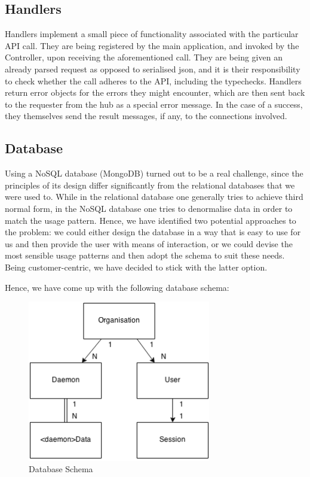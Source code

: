 \documentclass{l3proj}
\begin{document}
\subsection{Handlers}

Handlers implement a small piece of functionality associated with the particular API call. They are being registered by the main application, and invoked by the Controller, upon receiving the aforementioned call. They are being given an already parsed request as opposed to serialised json, and it is their responsibility to check whether the call adheres to the API, including the typechecks. Handlers return error objects for the errors they might encounter, which are then sent back to the requester from the hub as a special error message. In the case of a success, they themselves send the result messages, if any, to the connections involved.

\subsection{Database}

Using a NoSQL database (MongoDB) turned out to be a real challenge, since the principles of its design differ significantly from the relational databases that we were used to. While in the relational database one generally tries to achieve third normal form, in the NoSQL database one tries to denormalise data in order to match the usage pattern. Hence, we have identified two potential approaches to the problem: we could either design the database in a way that is easy to use for us and then provide the user with means of interaction, or we could devise the most sensible usage patterns and then adopt the schema to suit these needs. Being customer-centric, we have decided to stick with the latter option.

Hence, we have come up with the following database schema:

\begin{figure}[H]
\centering
\includegraphics[width=80mm]{images/DatabaseSchema.png}
\caption{Database Schema}
\end{figure}
\end{document}
